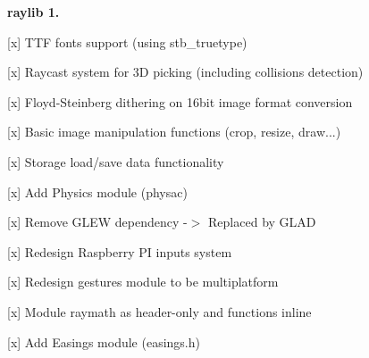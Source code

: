 {\bfseries{raylib 1.}}
\begin{DoxyItemize}
\item \mbox{[}x\mbox{]} TTF fonts support (using stb\+\_\+truetype)
\item \mbox{[}x\mbox{]} Raycast system for 3D picking (including collisions detection)
\item \mbox{[}x\mbox{]} Floyd-\/\+Steinberg dithering on 16bit image format conversion
\item \mbox{[}x\mbox{]} Basic image manipulation functions (crop, resize, draw...)
\item \mbox{[}x\mbox{]} Storage load/save data functionality
\item \mbox{[}x\mbox{]} Add Physics module (physac)
\item \mbox{[}x\mbox{]} Remove GLEW dependency -\/$>$ Replaced by GLAD
\item \mbox{[}x\mbox{]} Redesign Raspberry PI inputs system
\item \mbox{[}x\mbox{]} Redesign gestures module to be multiplatform
\item \mbox{[}x\mbox{]} Module raymath as header-\/only and functions inline
\item \mbox{[}x\mbox{]} Add Easings module (easings.\+h) 
\end{DoxyItemize}